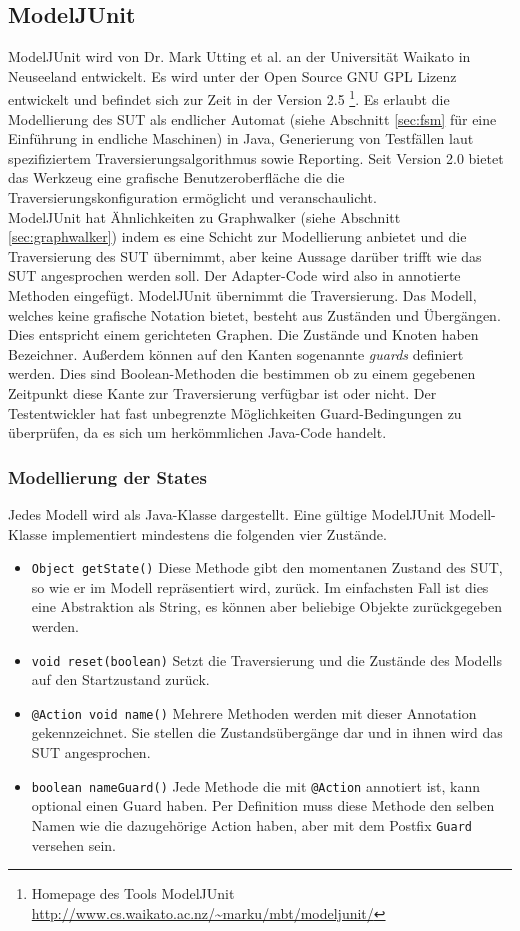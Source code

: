 \subsection{ModelJUnit}
\label{sec:modeljunit}
ModelJUnit wird von Dr. Mark Utting et al. an der Universität Waikato in Neuseeland entwickelt. Es wird unter der Open Source GNU GPL Lizenz entwickelt und befindet sich zur Zeit in der Version 2.5 \footnote{Homepage des Tools ModelJUnit \url{http://www.cs.waikato.ac.nz/~marku/mbt/modeljunit/}}. Es erlaubt die Modellierung des SUT als endlicher Automat (siehe Abschnitt \ref{sec:fsm} für eine Einführung in endliche Maschinen) in Java, Generierung von Testfällen laut spezifiziertem Traversierungsalgorithmus sowie Reporting. Seit Version 2.0 bietet das Werkzeug eine grafische Benutzeroberfläche die die Traversierungskonfiguration ermöglicht und veranschaulicht.\\
ModelJUnit hat Ähnlichkeiten zu Graphwalker (siehe Abschnitt \ref{sec:graphwalker}) indem es eine Schicht zur Modellierung anbietet und die Traversierung des SUT übernimmt, aber keine Aussage darüber trifft wie das SUT angesprochen werden soll. Der Adapter-Code wird also in annotierte Methoden eingefügt. ModelJUnit übernimmt die Traversierung. Das Modell, welches keine grafische Notation bietet, besteht aus Zuständen und Übergängen. Dies entspricht einem gerichteten Graphen. Die Zustände und Knoten haben Bezeichner. Außerdem können auf den Kanten sogenannte \textit{guards} definiert werden. Dies sind Boolean-Methoden  die bestimmen ob zu einem gegebenen Zeitpunkt diese Kante zur Traversierung verfügbar ist oder nicht. Der Testentwickler hat fast unbegrenzte Möglichkeiten Guard-Bedingungen zu überprüfen, da es sich um herkömmlichen Java-Code handelt.

\subsubsection{Modellierung der States}
Jedes Modell wird als Java-Klasse dargestellt. Eine gültige ModelJUnit Modell-Klasse implementiert mindestens die folgenden vier Zustände. 

\begin{itemize}
\item \texttt{Object getState()} Diese Methode gibt den momentanen Zustand des SUT, so wie er im Modell repräsentiert wird, zurück. Im einfachsten Fall ist dies eine Abstraktion als String, es können aber beliebige Objekte zurückgegeben werden.
\item \texttt{void reset(boolean)} Setzt die Traversierung und die Zustände des Modells auf den Startzustand zurück.
\item \texttt{@Action void name()} Mehrere Methoden werden mit dieser Annotation gekennzeichnet. Sie stellen die Zustandsübergänge dar und in ihnen wird das SUT angesprochen.
\item \texttt{boolean nameGuard()} Jede Methode die mit \texttt{@Action} annotiert ist, kann optional einen Guard haben. Per Definition muss diese Methode den selben Namen wie die dazugehörige Action haben, aber mit dem Postfix \texttt{Guard} versehen sein.
\end{itemize}

